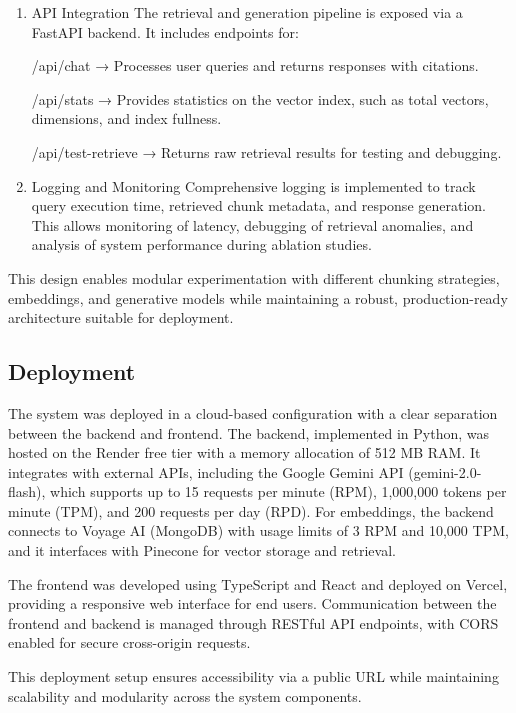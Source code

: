 \begin{enumerate}
	\item API Integration
	The retrieval and generation pipeline is exposed via a FastAPI backend. It includes endpoints for:
	
	/api/chat → Processes user queries and returns responses with citations.
	
	/api/stats → Provides statistics on the vector index, such as total vectors, dimensions, and index fullness.
	
	/api/test-retrieve → Returns raw retrieval results for testing and debugging.
	
	\item Logging and Monitoring
	Comprehensive logging is implemented to track query execution time, retrieved chunk metadata, and response generation. This allows monitoring of latency, debugging of retrieval anomalies, and analysis of system performance during ablation studies.
	
\end{enumerate}

This design enables modular experimentation with different chunking strategies, embeddings, and generative models while maintaining a robust, production-ready architecture suitable for deployment.

\subsection{Deployment}

The system was deployed in a cloud-based configuration with a clear separation between the backend and frontend. The backend, implemented in Python, was hosted on the Render free tier with a memory allocation of 512 MB RAM. It integrates with external APIs, including the Google Gemini API (gemini-2.0-flash), which supports up to 15 requests per minute (RPM), 1,000,000 tokens per minute (TPM), and 200 requests per day (RPD). For embeddings, the backend connects to Voyage AI (MongoDB) with usage limits of 3 RPM and 10,000 TPM, and it interfaces with Pinecone for vector storage and retrieval.

The frontend was developed using TypeScript and React and deployed on Vercel, providing a responsive web interface for end users. Communication between the frontend and backend is managed through RESTful API endpoints, with CORS enabled for secure cross-origin requests.

This deployment setup ensures accessibility via a public URL while maintaining scalability and modularity across the system components.




